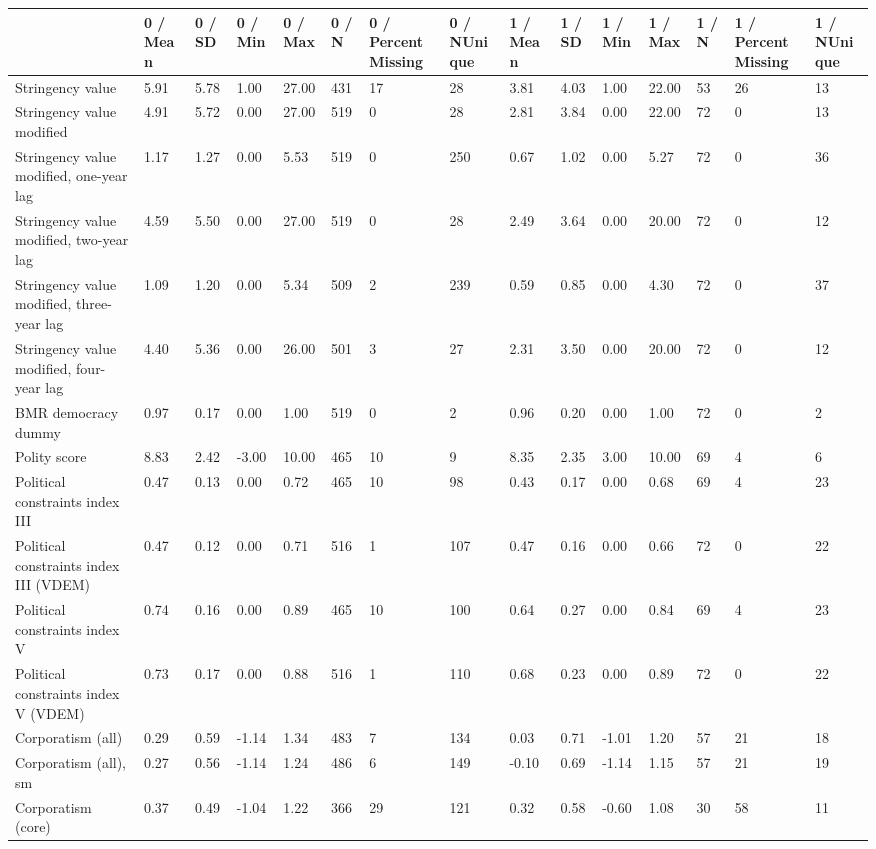 
\begin{longtable}{lllllllllllllll}
\toprule
  & 0 / Mean & 0 / SD & 0 / Min & 0 / Max & 0 / N & 0 / PercentMissing & 0 / NUnique & 1 / Mean & 1 / SD & 1 / Min & 1 / Max & 1 / N & 1 / PercentMissing & 1 / NUnique\\
\midrule
Stringency value & 5.91 & 5.78 & 1.00 & 27.00 & 431 & 17 & 28 & 3.81 & 4.03 & 1.00 & 22.00 & 53 & 26 & 13\\
Stringency value modified & 4.91 & 5.72 & 0.00 & 27.00 & 519 & 0 & 28 & 2.81 & 3.84 & 0.00 & 22.00 & 72 & 0 & 13\\
Stringency value modified, one-year lag & 1.17 & 1.27 & 0.00 & 5.53 & 519 & 0 & 250 & 0.67 & 1.02 & 0.00 & 5.27 & 72 & 0 & 36\\
Stringency value modified, two-year lag & 4.59 & 5.50 & 0.00 & 27.00 & 519 & 0 & 28 & 2.49 & 3.64 & 0.00 & 20.00 & 72 & 0 & 12\\
Stringency value modified, three-year lag & 1.09 & 1.20 & 0.00 & 5.34 & 509 & 2 & 239 & 0.59 & 0.85 & 0.00 & 4.30 & 72 & 0 & 37\\
\addlinespace
Stringency value modified, four-year lag & 4.40 & 5.36 & 0.00 & 26.00 & 501 & 3 & 27 & 2.31 & 3.50 & 0.00 & 20.00 & 72 & 0 & 12\\
BMR democracy dummy & 0.97 & 0.17 & 0.00 & 1.00 & 519 & 0 & 2 & 0.96 & 0.20 & 0.00 & 1.00 & 72 & 0 & 2\\
Polity score & 8.83 & 2.42 & -3.00 & 10.00 & 465 & 10 & 9 & 8.35 & 2.35 & 3.00 & 10.00 & 69 & 4 & 6\\
Political constraints index III & 0.47 & 0.13 & 0.00 & 0.72 & 465 & 10 & 98 & 0.43 & 0.17 & 0.00 & 0.68 & 69 & 4 & 23\\
Political constraints index III (VDEM) & 0.47 & 0.12 & 0.00 & 0.71 & 516 & 1 & 107 & 0.47 & 0.16 & 0.00 & 0.66 & 72 & 0 & 22\\
\addlinespace
Political constraints index V & 0.74 & 0.16 & 0.00 & 0.89 & 465 & 10 & 100 & 0.64 & 0.27 & 0.00 & 0.84 & 69 & 4 & 23\\
Political constraints index V (VDEM) & 0.73 & 0.17 & 0.00 & 0.88 & 516 & 1 & 110 & 0.68 & 0.23 & 0.00 & 0.89 & 72 & 0 & 22\\
Corporatism (all) & 0.29 & 0.59 & -1.14 & 1.34 & 483 & 7 & 134 & 0.03 & 0.71 & -1.01 & 1.20 & 57 & 21 & 18\\
Corporatism (all), sm & 0.27 & 0.56 & -1.14 & 1.24 & 486 & 6 & 149 & -0.10 & 0.69 & -1.14 & 1.15 & 57 & 21 & 19\\
Corporatism (core) & 0.37 & 0.49 & -1.04 & 1.22 & 366 & 29 & 121 & 0.32 & 0.58 & -0.60 & 1.08 & 30 & 58 & 11\\

\end{longtable}
